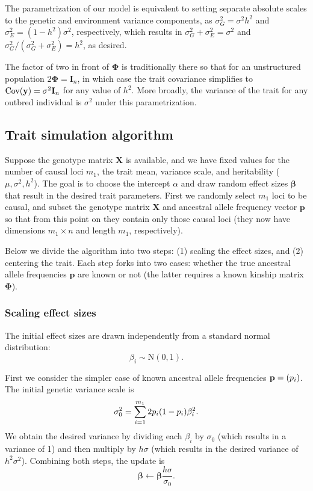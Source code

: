 \documentclass[11pt]{article}
\begin{document}
The parametrization of our model is equivalent to setting separate absolute scales to the genetic and environment variance components, as $\sigma^2_G = \sigma^2 h^2$ and $\sigma^2_E = (1-h^2) \sigma^2$, respectively, which results in $\sigma^2_G + \sigma^2_E = \sigma^2$ and $\sigma^2_G / (\sigma^2_G + \sigma^2_E) = h^2$, as desired.

The factor of two in front of $\mathbf{\Phi}$ is traditionally there so that for an unstructured population
$2 \mathbf{\Phi} = \mathbf{I}_n$, in which case the trait covariance simplifies to
$\operatorname{Cov}(\mathbf{y}) = \sigma^2 \mathbf{I}_n$ for any value of $h^2$.
More broadly, the variance of the trait for any outbred individual is $\sigma^2$ under this parametrization.

\subsection{Trait simulation algorithm}

Suppose the genotype matrix $\mathbf{X}$ is available, and we have fixed values for the number of causal loci $m_1$, the trait mean, variance scale, and heritability ($\mu, \sigma^2, h^2$).
The goal is to choose the intercept $\alpha$ and draw random effect sizes $\mathbf{\beta}$ that result in the desired trait parameters.
First we randomly select $m_1$ loci to be causal, and subset the genotype matrix $\mathbf{X}$ and ancestral allele frequency vector $\mathbf{p}$ so that from this point on they contain only those causal loci (they now have dimensions $m_1 \times n$ and length $m_1$, respectively).

Below we divide the algorithm into two steps: (1) scaling the effect sizes, and (2) centering the trait.
Each step forks into two cases: whether the true ancestral allele frequencies $\mathbf{p}$ are known or not (the latter requires a known kinship matrix $\mathbf{\Phi}$).

\subsubsection{Scaling effect sizes}

The initial effect sizes are drawn independently from a standard normal distribution:
$$
\beta_i \sim \text{N}(0, 1).
$$

First we consider the simpler case of known ancestral allele frequencies $\mathbf{p} = ( p_i  )$.
The initial genetic variance scale is
$$
\sigma^2_0
=
\sum_{i=1}^{m_1} 2  p_i   (1- p_i  ) \beta_i^2
.
$$
We obtain the desired variance by dividing each $\beta_i$ by $\sigma_0$ (which results in a variance of 1) and then multiply by $h \sigma$ (which results in the desired variance of $h^2 \sigma^2$).
Combining both steps, the update is
$$
\mathbf{\beta}
\leftarrow
\mathbf{\beta} \frac{ h \sigma }{\sigma_0}
.
$$
\end{document}
